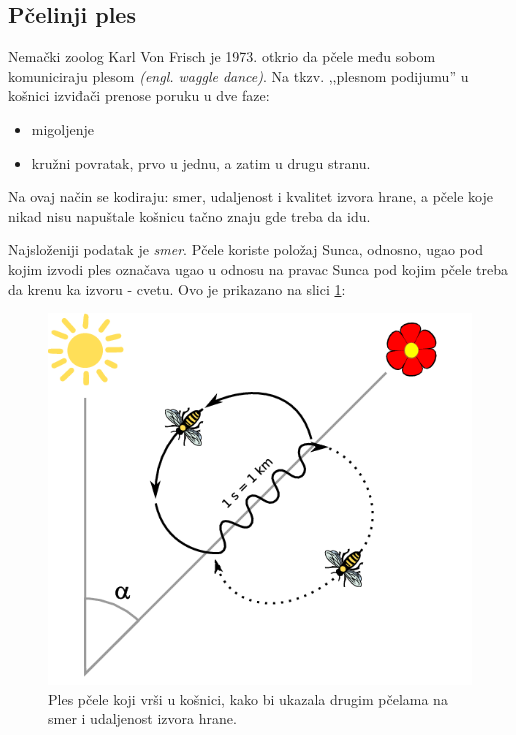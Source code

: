 \documentclass[a4paper]{article}
\begin{document}
{\subsection{Pčelinji ples}
\label{subsec:pcelinji ples}

Nemački zoolog Karl Von Frisch je 1973. otkrio da pčele među sobom komuniciraju plesom {\em(engl. waggle dance)}. Na tkzv. ,,plesnom podijumu'' u košnici izviđači prenose poruku u dve faze:
\begin{itemize}%
\setlength{\labelsep}{10pt}
	\item migoljenje
	\item kružni povratak, prvo u jednu, a zatim u drugu stranu.
\end{itemize}
Na ovaj način se kodiraju: smer, udaljenost i kvalitet izvora hrane, a pčele koje nikad nisu napuštale košnicu tačno znaju gde treba da idu.

Najsloženiji podatak je {\em smer}. Pčele koriste položaj Sunca, odnosno, ugao pod kojim izvodi ples označava ugao u odnosu na pravac Sunca pod kojim pčele treba da krenu ka izvoru - cvetu. Ovo je prikazano na slici \ref{fig:pcela2}:

\begin{figure}[h!]
\begin{center}
\includegraphics[scale=0.35]{waggle_dance.png}
\end{center}
\caption{Ples pčele koji vrši u košnici, kako bi ukazala drugim pčelama na smer i udaljenost izvora hrane.}
\label{fig:pcela2}
\end{figure}

}
\end{document}

